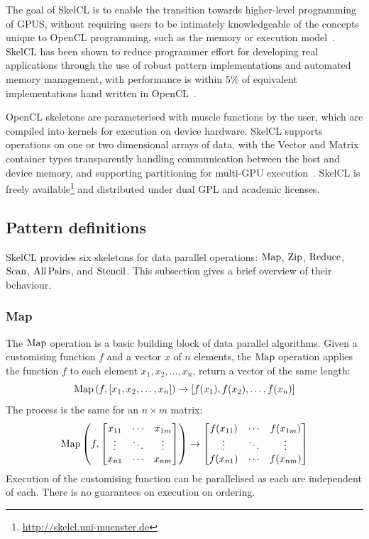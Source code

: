 The goal of SkelCL is to enable the transition towards higher-level
programming of GPUS, without requiring users to be intimately
knowledgeable of the concepts unique to OpenCL programming, such as
the memory or execution model~\cite{Steuwer2012}. SkelCL has been
shown to reduce programmer effort for developing real applications
through the use of robust pattern implementations and automated memory
management, with performance is within 5\% of equivalent
implementations hand written in OpenCL~\cite{Steuwer2013}.

OpenCL skeletons are parameterised with muscle functions by the user,
which are compiled into kernels for execution on device
hardware. SkelCL supports operations on one or two dimensional arrays
of data, with the Vector and Matrix container types transparently
handling communication between the host and device memory, and
supporting partitioning for multi-GPU
execution~\cite{Steuwer2013a}. SkelCL is freely
available\footnote{\url{http://skelcl.uni-muenster.de}} and
distributed under dual GPL and academic licenses.


\subsection{Pattern definitions}

SkelCL provides six skeletons for data parallel operations: $\operatorname*{Map}$,
$\operatorname*{Zip}$, $\operatorname*{Reduce}$, $\operatorname*{Scan}$, $\operatorname*{All\,Pairs}$, and $\operatorname*{Stencil}$. This
subsection gives a brief overview of their behaviour.


\subsubsection{Map}

The $\operatorname*{Map}$ operation is a basic building block of data parallel
algorithms. Given a customising function $f$ and a vector $x$ of $n$
elements, the $\operatorname*{Map}$ operation applies the function $f$ to each
element $x_1, x_2, \ldots, x_n$, return a vector of the same length:
%
\begin{equation}
\operatorname*{Map}\left(f, [x_1,x_2,\ldots,x_n]\right) \to [f(x_1),f(x_2),\ldots,f(x_n)]
\end{equation}
%
The process is the same for an $n \times m$ matrix:
%
\begin{equation}
\operatorname*{Map}\left(f,
\begin{bmatrix}
  x_{11} & \cdots & x_{1m} \\
  \vdots & \ddots & \vdots \\
  x_{n1} & \cdots & x_{nm}
\end{bmatrix}\right)
\to
\begin{bmatrix}
  f(x_{11}) & \cdots & f(x_{1m}) \\
  \vdots & \ddots & \vdots \\
  f(x_{n1}) & \cdots & f(x_{nm})
\end{bmatrix}
\end{equation}
%
Execution of the customising function can be parallelised as each are
independent of each. There is no guarantees on execution on ordering.


